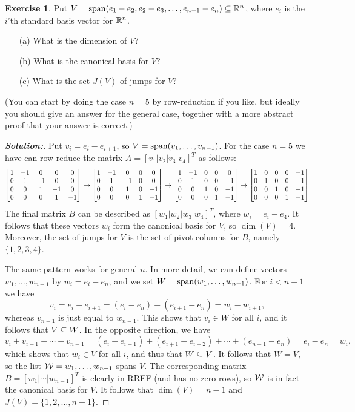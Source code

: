 \documentclass[a4paper]{amsart}
\theoremstyle{definition}
\newtheorem{exercise}{Exercise}
\newenvironment{solution}{\begin{proof}[\textbf{Solution:}] \vphantom{u}}{\end{proof}}
\begin{document}
\begin{exercise}\label{ex-jumps-ii}
 Put $V=\operatorname{span}(e_1-e_2,e_2-e_3,\dotsc,e_{n-1}-e_n)\subseteq{\mathbb{R}}^n$, where $e_i$
 is the $i$'th standard basis vector for ${\mathbb{R}}^n$.
 \begin{itemize}
  \item[(a)] What is the dimension of $V$?
  \item[(b)] What is the canonical basis for $V$?
  \item[(c)] What is the set $J(V)$ of jumps for $V$?
 \end{itemize}
 (You can start by doing the case $n=5$ by row-reduction if you like,
 but ideally you should give an answer for the general case, together
 with a more abstract proof that your answer is correct.)
\end{exercise}
\begin{solution}
 Put $v_i=e_i-e_{i+1}$, so $V=\operatorname{span}(v_1,\dotsc,v_{n-1})$.  
 For the case $n=5$ we have can row-reduce the matrix
 $A=[v_1|v_2|v_3|v_4]^T$ as follows:
 \[ 
   \left[\begin{matrix} 
    1&-1&0&0&0 \\
    0&1&-1&0&0 \\
    0&0&1&-1&0 \\
    0&0&0&1&-1
   \end{matrix}\right]
   \to 
   \left[\begin{matrix} 
    1&-1&0&0&0 \\
    0&1&-1&0&0 \\
    0&0&1&0&-1 \\
    0&0&0&1&-1
   \end{matrix}\right]
   \to 
   \left[\begin{matrix} 
    1&-1&0&0&0 \\
    0&1&0&0&-1 \\
    0&0&1&0&-1 \\
    0&0&0&1&-1
   \end{matrix}\right]
   \to 
   \left[\begin{matrix} 
    1&0&0&0&-1 \\
    0&1&0&0&-1 \\
    0&0&1&0&-1 \\
    0&0&0&1&-1
   \end{matrix}\right]
 \]
 The final matrix $B$ can be described as $[w_1|w_2|w_3|w_4]^T$, where
 $w_i=e_i-e_4$.  It follows that these vectors $w_i$ form the
 canonical basis for $V$, so $\dim(V)=4$.  Moreover, the set of jumps
 for $V$ is the set of pivot columns for $B$, namely $\{1,2,3,4\}$.

 The same pattern works for general $n$.  In more detail, we can
 define vectors $w_1,\dotsc,w_{n-1}$ by $w_i=e_i-e_n$, and we set
 $W=\operatorname{span}(w_1,\dotsc,w_{n-1})$.  For $i<n-1$ we have 
 \[ v_i = e_i-e_{i+1} = (e_i-e_n) - (e_{i+1}-e_n) = w_i-w_{i+1}, \]
 whereas $v_{n-1}$ is just equal to $w_{n-1}$.  This shows that
 $v_i\in W$ for all $i$, and it follows that $V\subseteq W$.  In the
 opposite direction, we have
 \[ v_i + v_{i+1} + \dotsb + v_{n-1} =
    (e_i-e_{i+1}) + (e_{i+1}-e_{i+2}) + \dotsb + (e_{n-1}-e_n) = 
    e_i - e_n = w_i,
 \]
 which shows that $w_i\in V$ for all $i$, and thus that $W\subseteq V$.  It
 follows that $W=V$, so the list $\mathcal{W}=w_1,\dotsc,w_{n-1}$ spans $V$.
 The corresponding matrix $B=[w_1|\dotsb|w_{n-1}]^T$ is clearly in
 RREF (and has no zero rows),
 so $\mathcal{W}$ is in fact the canonical basis for $V$.  It follows
 that $\dim(V)=n-1$ and $J(V)=\{1,2,\dotsc,n-1\}$.
\end{solution}
\end{document}
